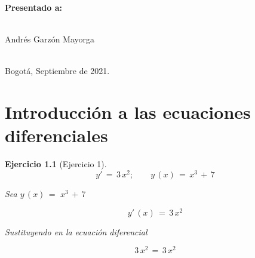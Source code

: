 \documentclass[a4paper,11pt]{book}
\newtheorem{ejer}{Ejercicio}[section]
\begin{document}
\begin{titlepage}
\begin{center}
\begin{large}
\end{large} 

\vspace*{0.3in} 

\end{center} 

\begin{center} 

{\bf Presentado a:} \\ 

\  

Andrés Garzón Mayorga \\ 

\ 

Bogot{\'a}, Septiembre de 2021. 

\end{center} 

\end{titlepage} 

\tableofcontents 

\chapter{Introducción a las ecuaciones diferenciales} 

\begin{ejer}[Ejercicio 1] 

$$y'\,=\,3\,x^{2}; \qquad \boxed{y\,(x)\,=\,x^{3}\,+\,7}$$
 
 Sea $y\,(x)\,=\,\,x^{3}\,+\,7$
 
 $$y'\,(x)\,=\,3\,x^{2}$$
 
 
 Sustituyendo en la ecuación diferencial
 
 $$\boxed{{3\,x^{2}}\,=\,3\,x^{2}}$$
    
\end{ejer} 
\end{document}
